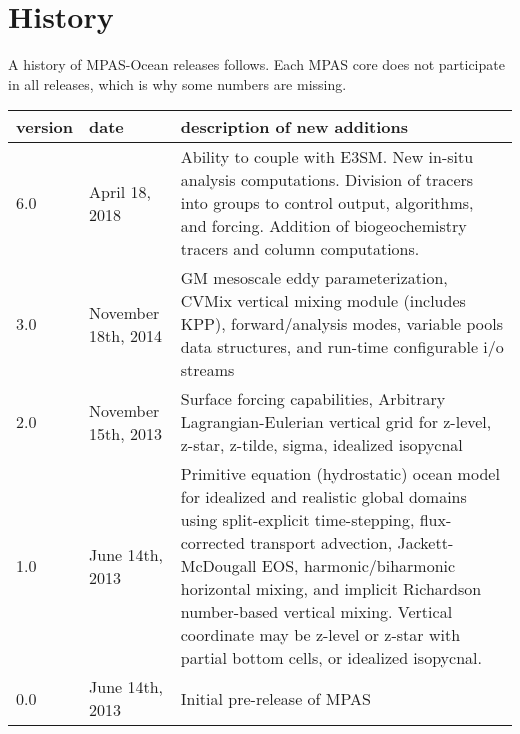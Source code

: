 \chapter*{History}
\label{chap:history}

A history of MPAS-Ocean releases follows.  Each MPAS core does not participate in all releases, which is why some numbers are missing.


\begin{tabular}{ll p{4in}} 
\hline\hline version & date & description of new additions  \\
\hline 
6.0 & April 18, 2018 & 
Ability to couple with E3SM.
New in-situ analysis computations.
Division of tracers into groups to control output, algorithms, and forcing.
Addition of biogeochemistry tracers and column computations.
\\
\hline 
3.0 & November 18th, 2014 & 
GM mesoscale eddy parameterization, CVMix vertical mixing module (includes KPP), forward/analysis modes, variable pools data structures, and run-time configurable i/o streams \\
\hline 
2.0 & November 15th, 2013 & 
Surface forcing capabilities, Arbitrary Lagrangian-Eulerian vertical grid for z-level, z-star, z-tilde, sigma, idealized isopycnal \\
\hline 
1.0 & June 14th, 2013 & Primitive equation (hydrostatic) ocean model for idealized and realistic global domains using split-explicit time-stepping, flux-corrected transport advection, Jackett-McDougall EOS, harmonic/biharmonic horizontal mixing, and implicit Richardson number-based vertical mixing.  Vertical coordinate may be z-level or z-star with partial bottom cells, or idealized isopycnal. \\
\hline 
0.0 & June 14th, 2013 & Initial pre-release of MPAS \\
\hline 
\end{tabular} 



\newpage
